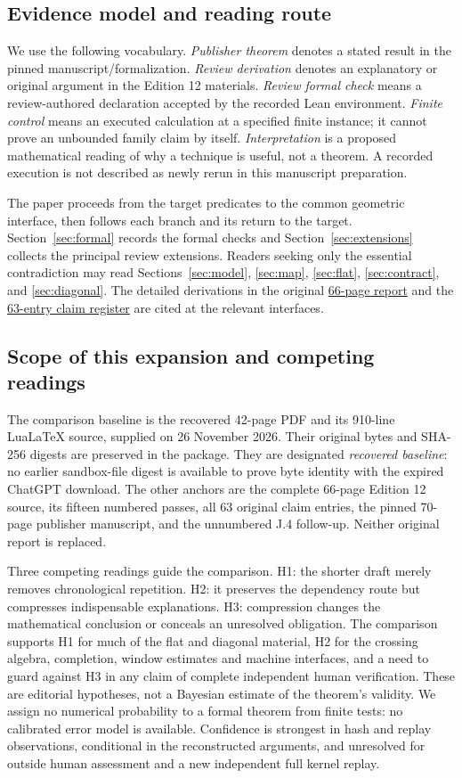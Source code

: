 \documentclass[11pt,letterpaper]{article}
\theoremstyle{definition}\newtheorem{definition}[theorem]{Definition}\newtheorem{example}[theorem]{Example}
\theoremstyle{remark}\newtheorem{remark}[theorem]{Remark}
\newcommand{\aud}[2]{\href{https://github.com/nousentllc/VP-VNP-Review/blob/567303d0bcf4f9d54390437b137752446e58ccd6/#1}{#2}}
\begin{document}
\subsection{Evidence model and reading route}
We use the following vocabulary. \emph{Publisher theorem} denotes a stated result in the pinned manuscript/formalization. \emph{Review derivation} denotes an explanatory or original argument in the Edition 12 materials. \emph{Review formal check} means a review-authored declaration accepted by the recorded Lean environment. \emph{Finite control} means an executed calculation at a specified finite instance; it cannot prove an unbounded family claim by itself. \emph{Interpretation} is a proposed mathematical reading of why a technique is useful, not a theorem. A recorded execution is not described as newly rerun in this manuscript preparation.

The paper proceeds from the target predicates to the common geometric interface, then follows each branch and its return to the target. Section~\ref{sec:formal} records the formal checks and Section~\ref{sec:extensions} collects the principal review extensions. Readers seeking only the essential contradiction may read Sections~\ref{sec:model}, \ref{sec:map}, \ref{sec:flat}, \ref{sec:contract}, and \ref{sec:diagonal}. The detailed derivations in the original \aud{report/VP_VNP_Research_Review.pdf}{66-page report} and the \aud{report/proof-coverage.csv}{63-entry claim register} are cited at the relevant interfaces.


\subsection{Scope of this expansion and competing readings}
The comparison baseline is the recovered 42-page PDF and its 910-line LuaLaTeX source, supplied on 26 November 2026. Their original bytes and SHA-256 digests are preserved in the package. They are designated \emph{recovered baseline}: no earlier sandbox-file digest is available to prove byte identity with the expired ChatGPT download. The other anchors are the complete 66-page Edition 12 source, its fifteen numbered passes, all 63 original claim entries, the pinned 70-page publisher manuscript, and the unnumbered J.4 follow-up. Neither original report is replaced.

Three competing readings guide the comparison. H1: the shorter draft merely removes chronological repetition. H2: it preserves the dependency route but compresses indispensable explanations. H3: compression changes the mathematical conclusion or conceals an unresolved obligation. The comparison supports H1 for much of the flat and diagonal material, H2 for the crossing algebra, completion, window estimates and machine interfaces, and a need to guard against H3 in any claim of complete independent human verification. These are editorial hypotheses, not a Bayesian estimate of the theorem's validity. We assign no numerical probability to a formal theorem from finite tests: no calibrated error model is available. Confidence is strongest in hash and replay observations, conditional in the reconstructed arguments, and unresolved for outside human assessment and a new independent full kernel replay.
\end{document}
